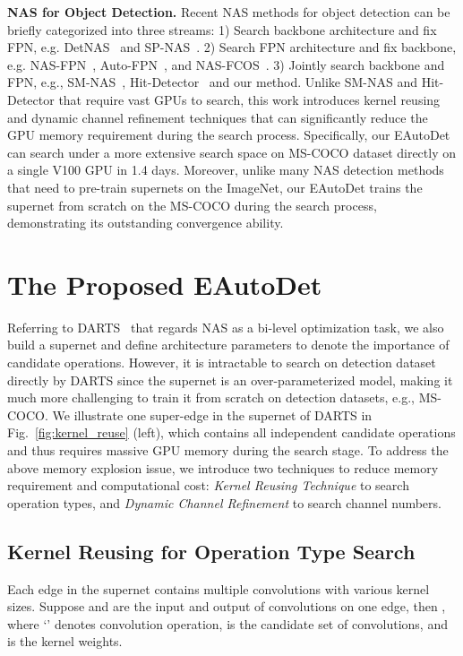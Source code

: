 \documentclass[letterpaper]{article} \usepackage{aaai22}  \usepackage{times}  \usepackage{helvet}  \usepackage{courier}  \usepackage[hyphens]{url}  \usepackage{graphicx} \urlstyle{rm} \def\UrlFont{\rm}  \usepackage{natbib}  \usepackage{caption} \DeclareCaptionStyle{ruled}{labelfont=normalfont,labelsep=colon,strut=off} \frenchspacing  \setlength{\pdfpagewidth}{8.5in}  \setlength{\pdfpageheight}{11in}
\begin{document}
\textbf{NAS for Object Detection.} 
Recent NAS methods for object detection can be briefly categorized into three streams: 1) Search backbone architecture and fix FPN, e.g. DetNAS~\cite{chen2019detnas} and SP-NAS~\cite{jiang2020sp}.
2) Search FPN architecture and fix backbone, e.g. NAS-FPN~\cite{ghiasi2019fpn}, Auto-FPN~\cite{autofpn}, and NAS-FCOS~\cite{wang2020fcos}. 
3) Jointly search backbone and FPN, e.g., SM-NAS~\cite{yao2020sm}, Hit-Detector~\cite{hit_detector} and our method.
Unlike SM-NAS and Hit-Detector that require vast GPUs to search, this work introduces kernel reusing and dynamic channel refinement techniques that can significantly reduce the GPU memory requirement during the search
process. Specifically, our EAutoDet can search under a more extensive search space on MS-COCO dataset directly on a single V100 GPU in 1.4 days.
Moreover, unlike many NAS detection methods~\cite{chen2019detnas,tan2020efficientdet,yao2020sm,hit_detector} that need to pre-train supernets on the ImageNet, our EAutoDet trains the supernet from scratch on the MS-COCO during the search process, demonstrating its outstanding convergence ability.




\section{The Proposed EAutoDet}
Referring to DARTS~\cite{liu2018darts} that regards NAS as a bi-level optimization task, we also build a supernet and define architecture parameters  to denote the importance of candidate operations.
However, it is intractable to search on detection dataset directly by DARTS since the supernet is an over-parameterized model, making it much more challenging to train it from scratch on detection datasets, e.g., MS-COCO. We illustrate one super-edge in the supernet of DARTS in Fig.~\ref{fig:kernel_reuse} (left), which contains all independent candidate operations and thus requires massive GPU memory during the search stage.
To address the above memory explosion issue, we introduce two techniques to reduce memory requirement and computational cost: \emph{Kernel Reusing Technique} to search operation types, and \emph{Dynamic Channel Refinement} to search channel numbers.




\subsection{Kernel Reusing for Operation Type Search}
Each edge in the supernet contains multiple convolutions with various kernel sizes. Suppose  and  are the input and output of convolutions on one edge, then , where `' denotes convolution operation,  is the candidate set of convolutions, and  is the kernel weights.
\end{document}
